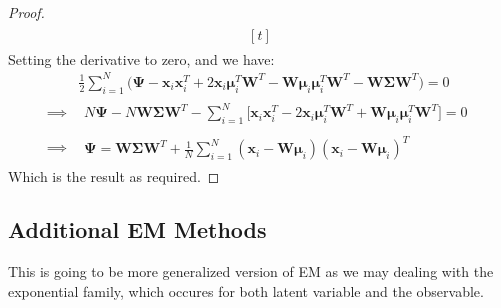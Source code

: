 \begin{proof}
\begin{equation*}
\begin{aligned}
\begin{aligned}[t]
        \end{aligned}
    \end{aligned}
    \end{equation*}
    Setting the derivative to zero, and we have:
    \begin{equation*}
    \begin{aligned}
        &\frac{1}{2}\sum^N_{i=1}\Bigg( \boldsymbol \Psi - \boldsymbol x_i\boldsymbol x_i^T + 2\boldsymbol x_i\boldsymbol \mu_i^T\boldsymbol W^T - \boldsymbol W\boldsymbol \mu_i\boldsymbol \mu_i^T\boldsymbol W^T - \boldsymbol W\boldsymbol \Sigma\boldsymbol W^T\Bigg) = 0 \\
        \implies& \begin{aligned}
            N\boldsymbol \Psi - N\boldsymbol W\boldsymbol \Sigma\boldsymbol W^T - \sum^N_{i=1} \Big[ \boldsymbol x_i\boldsymbol x_i^T - 2\boldsymbol x_i\boldsymbol \mu_i^T\boldsymbol W^T + \boldsymbol W\boldsymbol \mu_i\boldsymbol \mu_i^T\boldsymbol W^T \Big] = 0
        \end{aligned} \\
        \implies& \begin{aligned}
            \boldsymbol \Psi = \boldsymbol W\boldsymbol \Sigma\boldsymbol W^T  + \frac{1}{N}\sum^N_{i=1} (\boldsymbol x_i - \boldsymbol W\boldsymbol \mu_i)(\boldsymbol x_i - \boldsymbol W\boldsymbol \mu_i)^T
        \end{aligned}
    \end{aligned}
    \end{equation*}
    Which is the result as required. 
\end{proof}

\subsection{Additional EM Methods}

\begin{remark}
    This is going to be more generalized version of EM as we may dealing with the exponential family, which occures for both latent variable and the observable. 
\end{remark}

